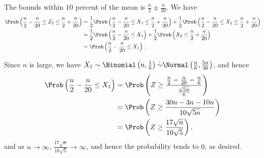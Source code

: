 \begin{enumerate}
          The bounds within \(10\) percent of the mean is \(\frac{n}{2} \pm \frac{n}{20}\). We have
          \begin{align*}
              \Prob\left(\frac{n}{2} - \frac{n}{20} \leq Z_2 \leq \frac{n}{2} + \frac{n}{20}\right) & = \frac{1}{2} \Prob\left(\frac{n}{2} - \frac{n}{20} \leq X_1 \leq \frac{n}{2} + \frac{n}{20}
              \right) + \frac{1}{2} \Prob\left(\frac{n}{2} - \frac{n}{20} \leq X_2 \leq \frac{n}{2} + \frac{n}{20}\right)                                                                                                                     \\
                                                                                                    & = \frac{1}{2} \Prob\left(\frac{n}{2} - \frac{n}{20} \leq X_1\right) + \frac{1}{2} \Prob\left(X_2 \leq \frac{n}{2} + \frac{n}{20}\right) \\
                                                                                                    & = \Prob\left(\frac{n}{2} - \frac{n}{20} \leq X_1\right).
          \end{align*}

          Since \(n\) is large, we have \(X_1 \sim \Binomial \left(n, \frac{1}{6}\right) \dot{\sim} \Normal \left(\frac{n}{6}, \frac{5n}{36}\right)\), and hence
          \begin{align*}
              \Prob\left(\frac{n}{2} - \frac{n}{20} \leq X_1\right) & = \Prob\left(Z \geq \frac{\frac{n}{2} - \frac{n}{20} - \frac{n}{6}}{\frac{\sqrt{5n}}{6}}\right) \\
                                                                    & = \Prob\left(Z \geq \frac{30n - 3n - 10n}{10 \sqrt{5n}}\right)                                  \\
                                                                    & = \Prob\left(Z \geq \frac{17 \sqrt{n}}{10 \sqrt{5}}\right),
          \end{align*}
          and as \(n \to \infty\), \(\frac{17 \sqrt{n}}{10 \sqrt{5}} \to \infty\), and hence the probability tends to \(0\), as desired.
\end{enumerate}